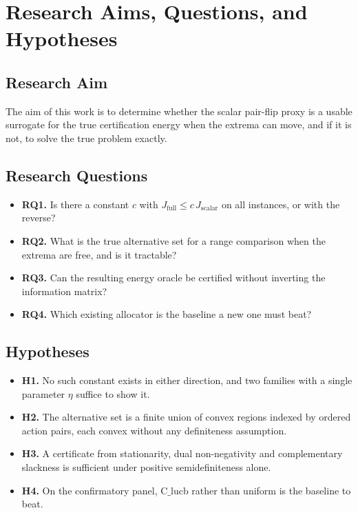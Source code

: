 \section{Research Aims, Questions, and Hypotheses}

\subsection{Research Aim}

The aim of this work is to determine whether the scalar pair-flip proxy is a usable surrogate
for the true certification energy when the extrema can move, and if it is not, to solve the
true problem exactly.

\subsection{Research Questions}

\begin{itemize}
\item \textbf{RQ1.} Is there a constant $c$ with $J_{\mathrm{full}}\le c\,J_{\mathrm{scalar}}$
on all instances, or with the reverse?
\item \textbf{RQ2.} What is the true alternative set for a range comparison when the extrema
are free, and is it tractable?
\item \textbf{RQ3.} Can the resulting energy oracle be certified without inverting the
information matrix?
\item \textbf{RQ4.} Which existing allocator is the baseline a new one must beat?
\end{itemize}

\subsection{Hypotheses}

\begin{itemize}
\item \textbf{H1.} No such constant exists in either direction, and two families with a single
parameter $\eta$ suffice to show it.
\item \textbf{H2.} The alternative set is a finite union of convex regions indexed by ordered
action pairs, each convex without any definiteness assumption.
\item \textbf{H3.} A certificate from stationarity, dual non-negativity and complementary
slackness is sufficient under positive semidefiniteness alone.
\item \textbf{H4.} On the confirmatory panel, $\mathrm{C\_lucb}$ rather than uniform is the
baseline to beat.
\end{itemize}

